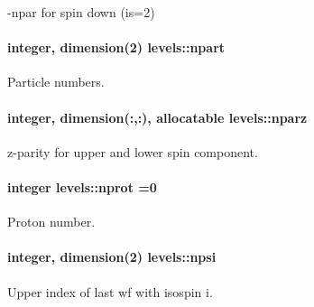\begin{DoxyItemize}
\item -\/npar for spin down (is=2) 
\end{DoxyItemize}
\paragraph[{\texorpdfstring{npart}{npart}}]{\setlength{\rightskip}{0pt plus 5cm}integer, dimension(2) levels\+::npart}\hypertarget{namespacelevels_ac7fcd5c6719ad0864f89f22dcb0e60f0}{}\label{namespacelevels_ac7fcd5c6719ad0864f89f22dcb0e60f0}


Particle numbers. 

\paragraph[{\texorpdfstring{nparz}{nparz}}]{\setlength{\rightskip}{0pt plus 5cm}integer, dimension(\+:,\+:), allocatable levels\+::nparz}\hypertarget{namespacelevels_a38ed4d213572f2840bd1bce5a2ec886a}{}\label{namespacelevels_a38ed4d213572f2840bd1bce5a2ec886a}


z-\/parity for upper and lower spin component. 

\paragraph[{\texorpdfstring{nprot}{nprot}}]{\setlength{\rightskip}{0pt plus 5cm}integer levels\+::nprot =0}\hypertarget{namespacelevels_a07af295449db01b659290e9192db954f}{}\label{namespacelevels_a07af295449db01b659290e9192db954f}


Proton number. 

\paragraph[{\texorpdfstring{npsi}{npsi}}]{\setlength{\rightskip}{0pt plus 5cm}integer, dimension(2) levels\+::npsi}\hypertarget{namespacelevels_aa9870c52b50461dd864875bf5572da11}{}\label{namespacelevels_aa9870c52b50461dd864875bf5572da11}


Upper index of last wf with isospin i. 

